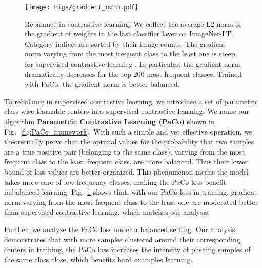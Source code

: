 \documentclass[10pt,twocolumn,letterpaper]{article}
\begin{document}
\begin{figure}[t]
	\begin{center}
		\texttt{[image: Figs/gradient\_norm.pdf]}
		\caption{Rebalance in contrastive learning. We collect the average L2 norm of the gradient of weights in the last classifier layer on ImageNet-LT. Category indices are
			sorted by their image counts. The gradient norm varying from the most frequent class to the least one is steep for supervised contrastive learning \cite{DBLP:conf/nips/KhoslaTWSTIMLK20}. In particular, the gradient norm dramatically decreases for the top 200 most frequent classes. Trained with PaCo, the gradient norm is better balanced.}
		\label{fig:gradient}
	\end{center}
\end{figure}

To rebalance in supervised contrastive learning, we introduce a set of parametric class-wise learnable centers into supervised contrastive learning. We name our algorithm \textbf{Parametric Contrastive Learning (PaCo)} shown in Fig.~\ref{fig:PaCo_framework}. With such a simple and yet effective operation, we theoretically prove that the optimal values for the probability that two samples are a true positive pair (belonging to the same class), varying from the most frequent class to the least frequent class, are more balanced. Thus their lower bound of loss values are better organized. This phenomenon means the model takes more care of low-frequency classes, making the PaCo loss benefit imbalanced learning. Fig.~\ref{fig:gradient} shows that, with our PaCo loss in training, gradient norm varying from the most frequent class to the least one are moderated better than supervised contrastive learning, which matches our analysis. 

Further, we analyze the PaCo loss under a balanced setting. Our analysis demonstrates that with more samples clustered around their corresponding centers in training, the PaCo loss increases the intensity of pushing samples of the same class close, which benefits hard examples learning.
\end{document}
